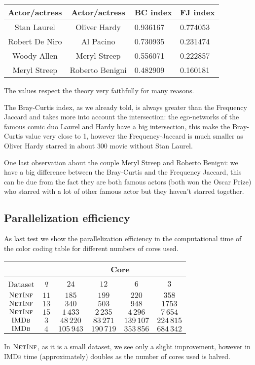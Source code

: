 	\begin{table}[h]
		\centering
		\begin{tabular}{c|c|l|l}
			Actor/actress & Actor/actress & BC index & FJ index\\ 
			\hline
			Stan Laurel & Oliver Hardy & 0.936167 & 0.774053 \\
			Robert De Niro & Al Pacino & 0.730935 & 0.231474\\
			Woody Allen & Meryl Streep & 0.556071 & 0.222857\\
			Meryl Streep & Roberto Benigni & 0.482909 & 0.160181\\
		\end{tabular}
	\end{table}

	The values respect the theory very faithfully for many reasons.
	
	The Bray-Curtis index, as we already told, is always greater than the Frequency Jaccard and takes more into account the intersection:
	the ego-networks of the famous comic duo Laurel and Hardy have a big intersection, this make the Bray-Curtis value very close to 1, however the Frequency-Jaccard is much smaller as Oliver Hardy starred in about $300$ movie without Stan Laurel.
	
	One last observation about the couple Meryl Streep and Roberto Benigni: we have a big difference between the Bray-Curtis and the Frequency Jaccard, this can be due from the fact they are both famous actors (both won the Oscar Prize) who starred with a lot of other famous actor but they haven't starred together.
	
	\subsection*{Parallelization efficiency}
	
	As last test we show the parallelization efficiency in the computational time of the color coding table for different numbers of cores used.
	
\begin{table}[h]
	\centering
	\label{my-label}
	\begin{tabular}{|c|c|c|c|c|c|}
		\cline{3-6}
		\multicolumn{2}{c}{} & \multicolumn{4}{|c|}{ Core } \\ 
		\hline
		Dataset         & $q$ & $24$ & $12$ & $6$ & $3$  \\ \hline\hline
		
		$\textsc{NetInf}$ & $11$ & $185$ & $199$ & $220$ & $358$  \\  \hline
		$\textsc{NetInf}$ & $13$ & $340$ & $503$ & $948$ & $1753$  \\  \hline
		$\textsc{NetInf}$ & $15$ & $1\,433$ & $2\,235$ & $4\,296$ & $7\,654$  \\  \hline  \hline
		$\textsc{IMDb}$ & $3$ &  $48\,220$ &  $83\,271$ & $139\,107$ & $224\,815$  \\  \hline
		$\textsc{IMDb}$ & $4$ & $105\,943$ & $190\,719$ & $353\,856$ & $684\,342$  \\  \hline

	\end{tabular}
\end{table}

In $\textsc{NetInf}$, as it is a small dataset, we see only a slight improvement, 
however in \textsc{IMDb} time (approximately) doubles as the number of cores used is halved.